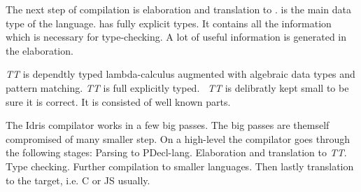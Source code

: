 The next step of compilation is elaboration and translation to \tti. \term is
the main data type of the \tti language. \tti has fully explicit types. It
contains all the information which is necessary for type-checking. A lot of
useful information is generated in the elaboration.

\textit{TT} is dependtly typed lambda-calculus augmented with algebraic data
types and pattern matching. \textit{TT} is full explicitly typed.~\cite{idris}
\textit{TT} is delibratly kept small to be sure it is correct. It is consisted
of well known parts.

The Idris compilator works in a few big passes. The big passes are themself
compromised of many smaller step. On a high-level the compilator goes through
the following stages: Parsing to PDecl-lang. Elaboration and translation to
\textit{TT}. Type checking. Further compilation to smaller languages. Then
lastly translation to the target, i.e. C or JS usually.
